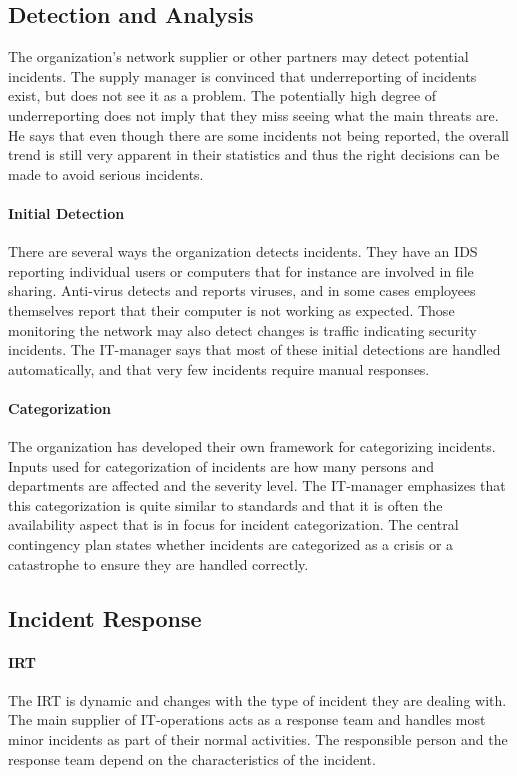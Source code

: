 \subsection{Detection and Analysis}
The organization's network supplier or other partners may detect potential incidents. The supply manager is convinced that underreporting of incidents exist, but does not see it as a problem. The potentially high degree of underreporting does not imply that they miss seeing what the main threats are. He says that even though there are some incidents not being reported, the overall trend is still very apparent in their statistics and thus the right decisions can be made to avoid serious incidents. 

\paragraph{Initial Detection}
There are several ways the organization detects incidents. They have an \ac{IDS} reporting individual users or computers that for instance are involved in file sharing. Anti-virus detects and reports viruses, and in some cases employees themselves report that their computer is not working as expected. Those monitoring the network may also detect changes is traffic indicating security incidents. The IT-manager says that most of these initial detections are handled automatically, and that very few incidents require manual responses. 

\paragraph{Categorization}
The organization has developed their own framework for categorizing incidents. Inputs used for categorization of incidents are how many persons and departments are affected and the severity level. The IT-manager emphasizes that this categorization is quite similar to standards and that it is often the availability aspect that is in focus for incident categorization. The central contingency plan states whether incidents are categorized as a crisis or a catastrophe to ensure they are handled correctly.

\subsection{Incident Response}

\paragraph{\acl{IRT}}
The \ac{IRT} is dynamic and changes with the type of incident they are dealing with. The main supplier of IT-operations acts as a response team and handles most minor incidents as part of their normal activities. The responsible person and the response team depend on the characteristics of the incident.   

